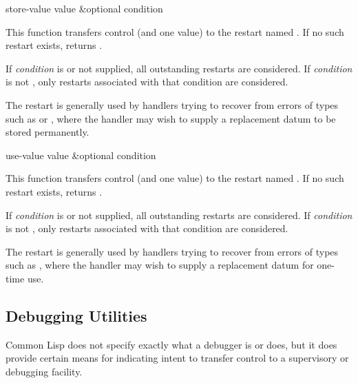 \begin{defun}[Function]
store-value value &optional condition

  This function transfers control (and one value) to the restart named
  . If no such restart exists,  returns .

 If \emph{condition} is  or not supplied, all outstanding restarts
are considered.
If \emph{condition} is not , only restarts associated
with that condition are considered.

  The  restart is generally used by handlers trying to recover
  from errors of types such as  or , where the handler
  may wish to supply a replacement datum to be stored permanently.
\end{defun}

\begin{defun}[Function]
use-value value &optional condition

  This function transfers control (and one value) to the restart named
  . If no such restart exists,  returns .
 
 If \emph{condition} is  or not supplied, all outstanding restarts
are considered.
If \emph{condition} is not , only restarts associated
with that condition are considered.

  The  restart is generally used by handlers trying to recover
  from errors of types such as , where the handler may wish to
  supply a replacement datum for one-time use.
\end{defun}


\subsection{Debugging Utilities}
\label{DEBUGGING-UTILITIES}

Common Lisp does not specify exactly what a debugger is or does,
but it does provide certain means for indicating intent to transfer control
to a supervisory or debugging facility.

